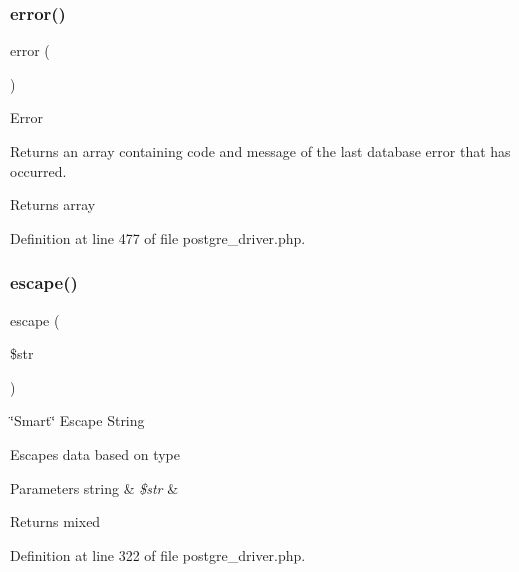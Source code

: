 \subsubsection{\texorpdfstring{error()}{error()}}
{\footnotesize\ttfamily error (\begin{DoxyParamCaption}{ }\end{DoxyParamCaption})}

Error

Returns an array containing code and message of the last database error that has occurred.

\begin{DoxyReturn}{Returns}
array 
\end{DoxyReturn}


Definition at line 477 of file postgre\+\_\+driver.\+php.

\mbox{\label{class_c_i___d_b__postgre__driver_ac8f37ca5703d4558c732e692194f8cd6}} 
\subsubsection{\texorpdfstring{escape()}{escape()}}
{\footnotesize\ttfamily escape (\begin{DoxyParamCaption}\item[{}]{\$str }\end{DoxyParamCaption})}

\char`\"{}\+Smart\char`\"{} Escape String

Escapes data based on type


\begin{DoxyParams}[1]{Parameters}
string & {\em \$str} & \\
\hline
\end{DoxyParams}
\begin{DoxyReturn}{Returns}
mixed 
\end{DoxyReturn}


Definition at line 322 of file postgre\+\_\+driver.\+php.

\mbox{\label{class_c_i___d_b__postgre__driver_a90355121e1ed009e0efdbd544ab56efa}} 
